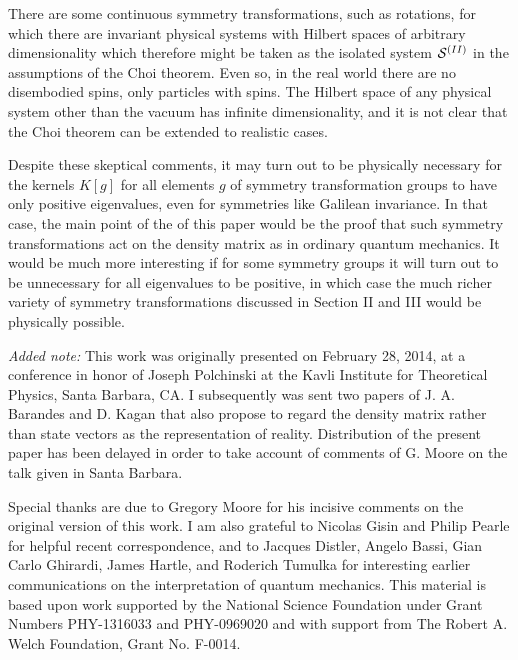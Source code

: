 There are some continuous symmetry transformations, such as rotations, for which there are invariant physical systems with Hilbert spaces of arbitrary dimensionality which  therefore might be taken as the isolated system ${\cal S}^{(II)}$ in the assumptions of the Choi theorem.  Even so, in the real world there are no disembodied spins, only particles with spins.  The Hilbert space of any physical system other than the vacuum has infinite dimensionality, and it is not clear that the Choi theorem can be extended to realistic cases.


Despite these skeptical comments, it may turn out to be physically necessary  for the kernels $K[g]$ for all elements $g$ of   symmetry transformation groups  to have only positive eigenvalues, even for symmetries like Galilean invariance.  In that case, the main point of  the of this paper would be the proof that such  symmetry transformations act on the density matrix as in ordinary quantum mechanics.  It would be much more interesting if for some symmetry groups it will turn out to be unnecessary for all eigenvalues to be positive, in which case the much richer variety of   symmetry transformations
discussed in Section II and III would be physically possible.  

\vspace{20pt}

\noindent
{\em Added note:}  This work was originally presented on February 28, 2014, at a conference in honor of Joseph Polchinski at the Kavli Institute for Theoretical Physics, Santa Barbara, CA.   I subsequently was sent two papers of J. A. Barandes and D. Kagan that also propose to regard the density matrix rather than state vectors as the representation of reality.  Distribution of the present paper has been  delayed in order to take account of comments of G. Moore on the talk given in Santa Barbara. 

\vspace{20pt}


Special thanks are due to Gregory Moore for his incisive comments on the original version of this work.  I am also grateful to Nicolas Gisin and Philip Pearle for helpful recent correspondence, and to Jacques Distler, Angelo Bassi, Gian Carlo Ghirardi, James Hartle, and Roderich Tumulka for interesting earlier communications on the interpretation of quantum mechanics.  This material is based upon work supported by the National Science Foundation under Grant Numbers PHY-1316033 and PHY-0969020 and with support from The Robert A. Welch Foundation, Grant No. F-0014.

